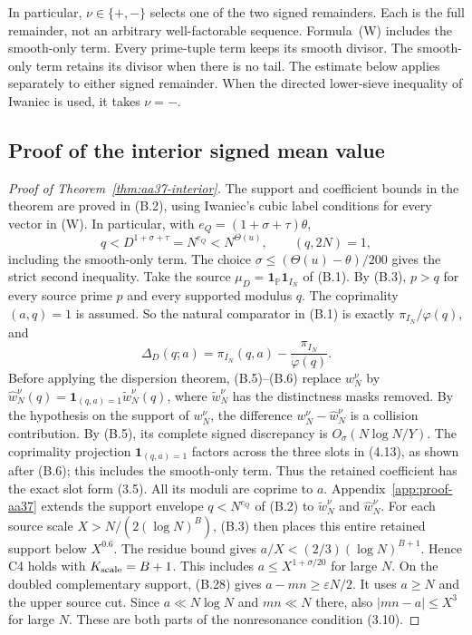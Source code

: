 In particular, $\nu\in\{+,-\}$ selects one of the two signed
remainders. Each is the full remainder, not an arbitrary
well-factorable sequence. Formula~\textup{(W)} includes the
smooth-only term. Every prime-tuple term keeps its smooth divisor. The smooth-only term
retains its divisor when there is no tail.
The estimate below applies separately to either signed remainder.
When the directed lower-sieve inequality of Iwaniec
\cite[Theorem~4]{AA37} is used, it takes $\nu=-$.

\subsection{Proof of the interior signed mean value}

\begin{proof}[Proof of Theorem~\ref{thm:aa37-interior}]
The support and coefficient bounds in the theorem are proved in
(B.2), using Iwaniec's cubic label conditions for every vector in
\textup{(W)}. In particular, with $e_Q=(1+\sigma+\tau)\theta$,
\[
 q<D^{1+\sigma+\tau}=N^{e_Q}<N^{\Theta(u)},
 \qquad (q,2N)=1,
\]
including the smooth-only term. The choice
$\sigma\le(\Theta(u)-\theta)/200$ gives the strict second inequality.
Take the source $\mu_D=\mathbf1_{\mathbb P}\mathbf1_{I_N}$ of (B.1).
By (B.3), $p>q$ for every source prime $p$ and every supported
modulus $q$. The coprimality $(a,q)=1$ is assumed. So the natural
comparator in (B.1) is exactly $\pi_{I_N}/\varphi(q)$, and
\[
 \Delta_D(q;a)=\pi_{I_N}(q,a)-\frac{\pi_{I_N}}{\varphi(q)}.
\]
Before applying the dispersion theorem, (B.5)--(B.6) replace
$w_N^\nu$ by
$\widehat w_N^\nu(q)=\mathbf1_{(q,a)=1}\widetilde w_N^\nu(q)$,
where $\widetilde w_N^\nu$ has the distinctness masks removed.
By the hypothesis on the support of $w_N^\nu$, the difference
$w_N^\nu-\widehat w_N^\nu$ is a collision contribution. By (B.5),
its complete signed discrepancy is $O_\sigma(N\log N/Y)$.
The coprimality projection $\mathbf1_{(q,a)=1}$ factors across the
three slots in (4.13), as shown after (B.6); this includes the
smooth-only term. Thus the retained coefficient has the exact
slot form (3.5). All its moduli are coprime to $a$.
Appendix~\ref{app:proof-aa37} extends the support envelope
$q<N^{e_Q}$ of (B.2) to $\widetilde w_N^\nu$ and $\widehat w_N^\nu$.
For each source scale $X>N/(2(\log N)^B)$, (B.3) then places this entire
retained support below $X^{0.6}$. The residue bound gives
$a/X<(2/3)(\log N)^{B+1}$. Hence C4 holds with
$K_{\rm scale}=B+1$. This includes $a\le X^{1+\sigma/20}$ for large
$N$. On the doubled complementary support, (B.28) gives
$a-mn\ge\varepsilon N/2$. It uses $a\ge N$ and the upper source cut. Since $a\ll N\log N$ and $mn\ll N$ there, also
$|mn-a|\le X^3$ for large $N$. These are both parts of the
nonresonance condition (3.10).


\end{proof}
